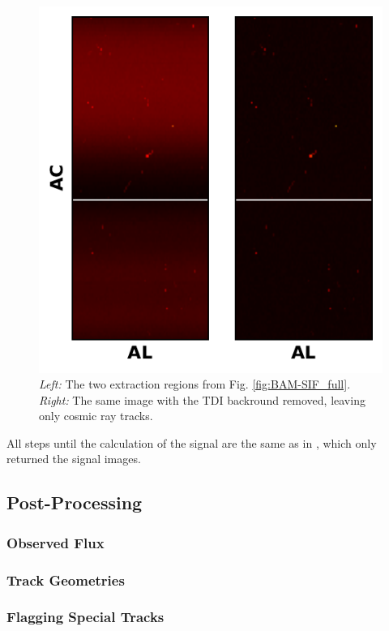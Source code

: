 \documentclass[a4paper, 11pt]{article}
\begin{document}
\begin{figure}
  \centering
  \includegraphics{images/BAM-SIF_background}
  \caption{\textit{Left:} The two extraction regions from Fig. \ref{fig:BAM-SIF_full}. \textit{Right:} The same image with the TDI backround removed, leaving only cosmic ray tracks.}
  \label{fig:BAM-SIF_background}
\end{figure}

All steps until the calculation of the signal are the same as in \cite{GAIA-DE-TN-ESAC-RKO-033}, which only returned the signal images.

\subsection{Post-Processing}

\subsubsection{Observed Flux}

\subsubsection{Track Geometries}

\subsubsection{Flagging Special Tracks}
\end{document}
